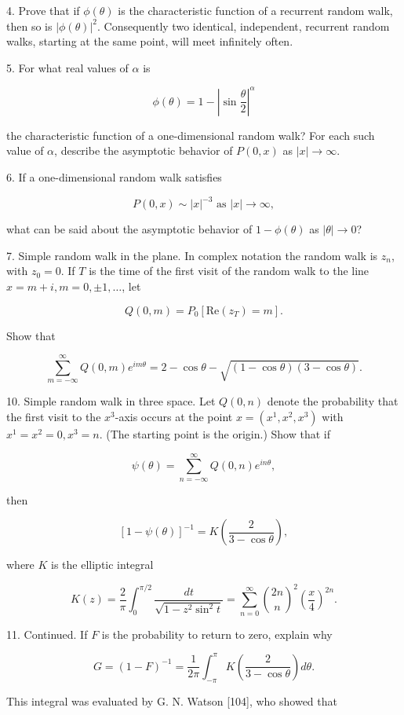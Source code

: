 4. Prove that if $\phi(\theta)$ is the characteristic function of a recurrent random walk, then so is $|\phi(\theta)|^2$. Consequently two identical, independent, recurrent random walks, starting at the same point, will meet infinitely often.

5. For what real values of $\alpha$ is

$$\phi(\theta) = 1 - \left| \sin \frac{\theta}{2} \right|^\alpha$$

the characteristic function of a one-dimensional random walk? For each such value of $\alpha$, describe the asymptotic behavior of $P(0,x)$ as $|x| \to \infty$.

6. If a one-dimensional random walk satisfies

$$P(0,x) \sim |x|^{-3} \text{ as } |x| \to \infty,$$

what can be said about the asymptotic behavior of $1 - \phi(\theta)$ as $|\theta| \to 0$?

7. Simple random walk in the plane. In complex notation the random walk is $z_n$, with $z_0 = 0$. If $T$ is the time of the first visit of the random walk to the line $x = m + i, m = 0, \pm 1, \ldots$, let

$$Q(0,m) = P_0[\text{Re} (z_T) = m].$$

Show that

$$\sum_{m=-\infty}^{\infty} Q(0,m)e^{im\theta} = 2 - \cos \theta - \sqrt{(1 - \cos \theta)(3 - \cos \theta)}.$$

10. Simple random walk in three space. Let $Q(0,n)$ denote the probability that the first visit to the $x^3$-axis occurs at the point $x = (x^1, x^2, x^3)$ with $x^1 = x^2 = 0, x^3 = n$. (The starting point is the origin.) Show that if

$$\psi(\theta) = \sum_{n=-\infty}^{\infty} Q(0,n)e^{in\theta},$$

then

$$[1 - \psi(\theta)]^{-1} = K\left(\frac{2}{3 - \cos\theta}\right),$$

where $K$ is the elliptic integral

$$K(z) = \frac{2}{\pi} \int_{0}^{\pi/2} \frac{dt}{\sqrt{1 - z^2 \sin^2 t}} = \sum_{n=0}^{\infty} \binom{2n}{n}^2 \left(\frac{x}{4}\right)^{2n}.$$

11. Continued. If $F$ is the probability to return to zero, explain why

$$G = (1 - F)^{-1} = \frac{1}{2\pi} \int_{-\pi}^{\pi} K\left(\frac{2}{3 - \cos\theta}\right) d\theta.$$

This integral was evaluated by G. N. Watson [104], who showed that

